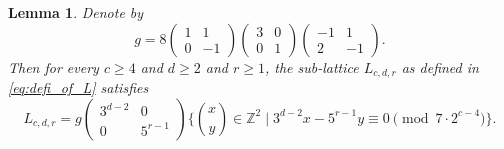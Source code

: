 \documentclass[10pt,a4paper]{amsart}
\newtheorem{lem}{Lemma}
\newcommand{\Z}{\bb Z}
\newcommand{\bb}[1]{\mathbb{#1}}
\begin{document}
	\begin{lem}\label{defin-Lcde}
		Denote by 
		$$g = 8 
		\left( 
		\begin{array}{rr}
			1 & 1\\
			0 & -1  
		\end{array}\right)
		\begin{pmatrix}
			3 & 0 \\
			0 & 1
		\end{pmatrix}
		\left( \begin{array}{rr}
			-1 & 1 \\
			2 & -1
		\end{array}\right).$$
		Then for every $c\geq 4$ and $d\geq 2$ and $r\geq 1$, the sub-lattice $L_{c,d,r}$ as defined in \cref{eq:defi_of_L} satisfies 
		$$L_{c,d,r} = g
		\begin{pmatrix}
			3^{d-2} & 0 \\
			0 & 5^{r-1}
		\end{pmatrix} 
		\bigg\lbrace 
		\binom{x}{y} \in \Z^2
		\; \bigg\vert \;
		3^{d-2} x - 5^{r-1} y \equiv 0 \pmod{ 7 \cdot 2^{c-4}}
		\bigg\rbrace.$$
	\end{lem}
\end{document}
